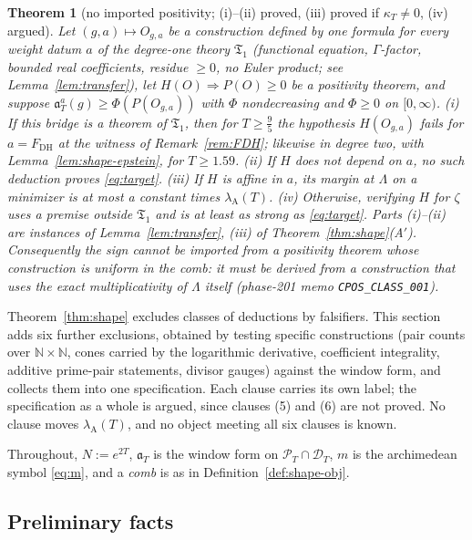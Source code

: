 \documentclass[11pt]{amsart}
\newtheorem{theorem}{Theorem}[section]
\theoremstyle{definition}
\theoremstyle{remark}
\newcommand{\N}{\mathbb N}
\newcommand{\PT}{\mathcal P_T}
\newcommand{\lamA}{\lambda_{\mathrm A}(T)}
\begin{document}
\begin{theorem}[no imported positivity; (i)--(ii) proved, (iii) proved if $\kappa_T\ne0$, (iv) argued]\label{thm:noimport}
Let $(g,a)\mapsto O_{g,a}$ be a construction defined by one formula for every weight datum $a$ of the degree-one theory
$\mathfrak T_1$ (functional equation, $\Gamma$-factor, bounded real coefficients, residue $\ge0$, no Euler product; see
Lemma~\ref{lem:transfer}), let $H(O)\Rightarrow P(O)\ge0$ be a positivity theorem, and suppose
$\mathfrak a_T^a(g)\ge\Phi(P(O_{g,a}))$ with $\Phi$ nondecreasing and $\Phi\ge0$ on $[0,\infty)$.
(i) If this bridge is a theorem of $\mathfrak T_1$, then for $T\ge\frac95$ the hypothesis $H(O_{g,a})$ fails for
$a=F_{\mathrm{DH}}$ at the witness of Remark~\ref{rem:FDH}; likewise in degree two, with Lemma~\ref{lem:shape-epstein}, for
$T\ge1.59$. (ii) If $H$ does not depend on $a$, no such deduction proves \eqref{eq:target}. (iii) If $H$ is affine in $a$,
its margin at $\Lambda$ on a minimizer is at most a constant times $\lamA$. (iv) Otherwise, verifying $H$ for $\zeta$ uses a
premise outside $\mathfrak T_1$ and is at least as strong as \eqref{eq:target}. Parts (i)--(ii) are instances of
Lemma~\ref{lem:transfer}, (iii) of Theorem~\ref{thm:shape}(A$'$). Consequently the sign cannot be imported from a positivity
theorem whose construction is uniform in the comb: it must be derived from a construction that uses the exact
multiplicativity of $\Lambda$ itself (phase-201 memo \texttt{CPOS\_CLASS\_001}).
\end{theorem}


Theorem~\ref{thm:shape} excludes classes of deductions by falsifiers. This section adds six further exclusions, obtained by testing
specific constructions (pair counts over $\N\times\N$, cones carried by the logarithmic derivative, coefficient integrality, additive
prime-pair statements, divisor gauges) against the window form, and collects them into one specification. Each clause carries its own
label; the specification as a whole is argued, since clauses (5) and (6) are not proved. No clause moves $\lamA$, and no object meeting
all six clauses is known.

Throughout, $N:=e^{2T}$, $\mathfrak a_T$ is the window form on $\PT\cap\mathcal D_T$, $m$ is the archimedean symbol \eqref{eq:m}, and a
\emph{comb} is as in Definition~\ref{def:shape-obj}.

\subsection{Preliminary facts}
\end{document}
